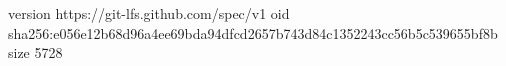 version https://git-lfs.github.com/spec/v1
oid sha256:e056e12b68d96a4ee69bda94dfcd2657b743d84c1352243cc56b5c539655bf8b
size 5728
